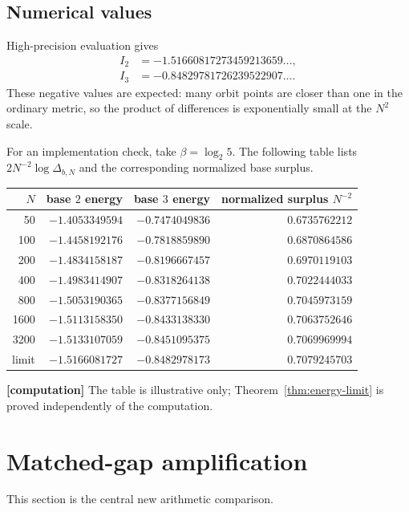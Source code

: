 \documentclass[11pt,oneside]{article}
\theoremstyle{definition}
\theoremstyle{remark}
\newcommand{\statuscomp}{\textcolor{amber}{\textbf{[computation]}}}
\begin{document}
\subsection{Numerical values}

High-precision evaluation gives
\begin{align}
 I_2&=-1.51660817273459213659\ldots,\label{eq:I2}\\
 I_3&=-0.84829781726239522907\ldots.\label{eq:I3}
\end{align}
These negative values are expected: many orbit points are closer than one in the ordinary
metric, so the product of differences is exponentially small at the $N^2$ scale.

For an implementation check, take $\beta=\log_2 5$.  The following table lists
$2N^{-2}\log\Delta_{b,N}$ and the corresponding normalized base surplus.

\begin{center}
\begin{tabular}{rrrr}
\toprule
$N$ & base $2$ energy & base $3$ energy & normalized surplus $N^{-2}$ \\
\midrule
50   & $-1.4053349594$ & $-0.7474049836$ & $0.6735762212$ \\
100  & $-1.4458192176$ & $-0.7818859890$ & $0.6870864586$ \\
200  & $-1.4834158187$ & $-0.8196667457$ & $0.6970119103$ \\
400  & $-1.4983414907$ & $-0.8318264138$ & $0.7022444033$ \\
800  & $-1.5053190365$ & $-0.8377156849$ & $0.7045973159$ \\
1600 & $-1.5113158350$ & $-0.8433138330$ & $0.7063752646$ \\
3200 & $-1.5133107059$ & $-0.8451095375$ & $0.7069969994$ \\
\midrule
limit & $-1.5166081727$ & $-0.8482978173$ & $0.7079245703$ \\
\bottomrule
\end{tabular}
\end{center}
\statuscomp{}  The table is illustrative only; Theorem~\ref{thm:energy-limit} is proved
independently of the computation.

\section{Matched-gap amplification}
\label{sec:amplification}

This section is the central new arithmetic comparison.
\end{document}
